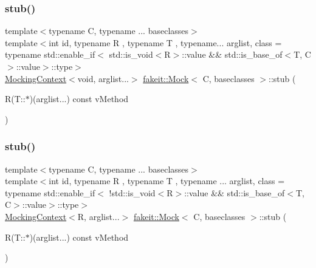 \mbox{\label{classfakeit_1_1Mock_a1861b19f93de559fc183139f1ecdfa6b}} 
\subsubsection{\texorpdfstring{stub()}{stub()}\hspace{0.1cm}{\footnotesize\ttfamily [26/72]}}
{\footnotesize\ttfamily template$<$typename C, typename ... baseclasses$>$ \\
template$<$int id, typename R , typename T , typename... arglist, class  = typename std\+::enable\+\_\+if$<$                std\+::is\+\_\+void$<$\+R$>$\+::value \&\& std\+::is\+\_\+base\+\_\+of$<$\+T, C$>$\+::value$>$\+::type$>$ \\
\mbox{\hyperlink{classfakeit_1_1MockingContext}{Mocking\+Context}}$<$void, arglist...$>$ \mbox{\hyperlink{classfakeit_1_1Mock}{fakeit\+::\+Mock}}$<$ C, baseclasses $>$\+::stub (\begin{DoxyParamCaption}\item[{R(T\+::$\ast$)(arglist...) const}]{v\+Method }\end{DoxyParamCaption})\hspace{0.3cm}{\ttfamily [inline]}}

\mbox{\label{classfakeit_1_1Mock_a7a8f38b58b068b35f263eee42d75c162}} 
\subsubsection{\texorpdfstring{stub()}{stub()}\hspace{0.1cm}{\footnotesize\ttfamily [27/72]}}
{\footnotesize\ttfamily template$<$typename C, typename ... baseclasses$>$ \\
template$<$int id, typename R , typename T , typename ... arglist, class  = typename std\+::enable\+\_\+if$<$                !std\+::is\+\_\+void$<$\+R$>$\+::value \&\& std\+::is\+\_\+base\+\_\+of$<$\+T, C$>$\+::value$>$\+::type$>$ \\
\mbox{\hyperlink{classfakeit_1_1MockingContext}{Mocking\+Context}}$<$R, arglist...$>$ \mbox{\hyperlink{classfakeit_1_1Mock}{fakeit\+::\+Mock}}$<$ C, baseclasses $>$\+::stub (\begin{DoxyParamCaption}\item[{R(T\+::$\ast$)(arglist...) const}]{v\+Method }\end{DoxyParamCaption})\hspace{0.3cm}{\ttfamily [inline]}}

